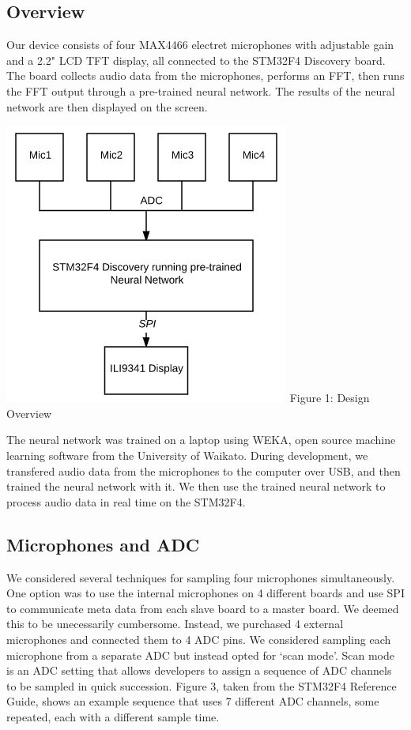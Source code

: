 \documentclass[twoside]{article}
\begin{document}
\begin{multicols}{2}
\subsection{Overview}

Our device consists of four MAX4466 electret microphones with adjustable gain and a 2.2" LCD TFT display, all connected to the STM32F4 Discovery board. The board collects audio data from the microphones, performs an FFT, then runs the FFT output through a pre-trained neural network. The results of the neural network are then displayed on the screen.

\begin{center}
\includegraphics[scale=0.45]{overview.png}
\newline Figure 1: Design Overview
\end{center}

The neural network was trained on a laptop using WEKA, open source machine learning software from the University of Waikato. During development, we transfered audio data from the microphones to the computer over USB, and then trained the neural network with it. We then use the trained neural network to process audio data in real time on the STM32F4. 

\subsection{Microphones and ADC}

We considered several techniques for sampling four microphones simultaneously. One option was to use the internal microphones on 4 different boards and use SPI to communicate meta data from each slave board to a master board. We deemed this to be unecessarily cumbersome. Instead, we purchased 4 external microphones and connected them to 4 ADC pins. We considered sampling each microphone from a separate ADC but instead opted for `scan mode'. Scan mode is an ADC setting that allows developers to assign a sequence of ADC channels to be sampled in quick succession. Figure 3, taken from the STM32F4 Reference Guide, shows an example sequence that uses 7 different ADC channels, some repeated, each with a different sample time.


\end{multicols}
\end{document}
